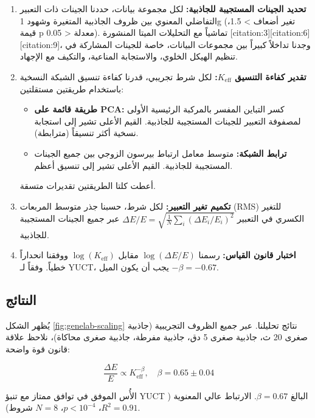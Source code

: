 \documentclass[11pt,a4paper]{article}
\newcommand{\Keff}{K_{\mathrm{eff}}}
\theoremstyle{remark}
\begin{document}
	\begin{enumerate}
		\item \textbf{تحديد الجينات المستجيبة للجاذبية:} لكل مجموعة بيانات، حددنا الجينات ذات التعبير التفاضلي المعنوي بين ظروف الجاذبية المتغيرة وشهود 1g (تغير أضعاف > 1.5، قيمة p معدلة < 0.05). تماشياً مع التحليلات الميتا المنشورة [citation:3][citation:6][citation:9]، وجدنا تداخلاً كبيراً بين مجموعات البيانات، خاصة للجينات المشاركة في تنظيم الهيكل الخلوي، والاستجابة المناعية، والتكيف مع الإجهاد.
		
		\item \textbf{تقدير كفاءة التنسيق \(\Keff\):} لكل شرط تجريبي، قدرنا كفاءة تنسيق الشبكة النسخية باستخدام طريقتين مستقلتين:
		\begin{itemize}
			\item \textbf{طريقة قائمة على PCA:} كسر التباين المفسر بالمركبة الرئيسية الأولى لمصفوفة التعبير للجينات المستجيبة للجاذبية. القيم الأعلى تشير إلى استجابة نسخية أكثر تنسيقاً (مترابطة).
			\item \textbf{ترابط الشبكة:} متوسط معامل ارتباط بيرسون الزوجي بين جميع الجينات المستجيبة للجاذبية. القيم الأعلى تشير إلى تنسيق أعظم.
		\end{itemize}
		أعطت كلتا الطريقتين تقديرات متسقة.
		
		\item \textbf{تكميم تغير التعبير:} لكل شرط، حسبنا جذر متوسط المربعات (RMS) للتغير الكسري في التعبير \(\Delta E/E = \sqrt{\frac{1}{N}\sum_i (\Delta E_i/E_i)^2}\) عبر جميع الجينات المستجيبة للجاذبية.
		
		\item \textbf{اختبار قانون القياس:} رسمنا \(\log(\Delta E/E)\) مقابل \(\log(\Keff)\) ووفقنا انحداراً خطياً. وفقاً لـ YUCT، يجب أن يكون الميل \(-\beta = -0.67\).
	\end{enumerate}
	
	\subsection{النتائج}
	
	يُظهر الشكل \ref{fig:genelab-scaling} نتائج تحليلنا. عبر جميع الظروف التجريبية (جاذبية صغرى 20 ث، جاذبية صغرى 5 دق، جاذبية مفرطة، جاذبية صغرى محاكاة)، نلاحظ علاقة قانون قوة واضحة:
	
	\begin{equation}
		\frac{\Delta E}{E} \propto \Keff^{-\beta}, \quad \beta = 0.65 \pm 0.04
		\label{eq:genelab-fit}
	\end{equation}
	
	الأُس الموفق في توافق ممتاز مع تنبؤ YUCT البالغ \(\beta = 0.67\). الارتباط عالي المعنوية (\(R^2 = 0.91\)، \(p < 10^{-4}\)، \(N = 8\) شروط).
	
\end{document}
